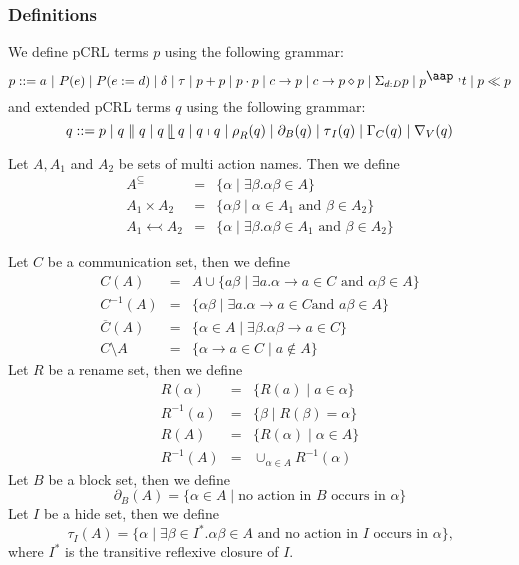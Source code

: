 \documentclass{article}
\begin{document}
\subsubsection{Definitions}

We define pCRL terms $p$ using the following grammar:%
\[
p::=a\ \mathbf{|}\ P(e)\mid P(e:=d)\mid \delta \mid \tau \mid p+p\mid p\cdot
p\mid c\rightarrow p\mid c\rightarrow p\diamond p\mid \Sigma _{d:D}p\mid p^{%
\mathbin{\mbox{\aap ,}}}t\mid p\ll p 
\]%
and extended pCRL terms $q$ using the following grammar:%
\[
q::=p\mid q\parallel q\mid q\mathbin{\mathrel{\llfloor}}q\mid q\shortmid
q\mid \rho _{R}(q)\mid \partial _{B}(q)\mid \tau _{I}(q)\mid \Gamma
_{C}(q)\mid \nabla _{V}(q) 
\]

Let $A,A_{1}$ and $A_{2}$ be sets of multi action names. Then we define%
\begin{eqnarray*}
A^{\subseteq } &=&\{\alpha \mid \exists \beta .\alpha \beta \in A\} \\
A_{1}\times A_{2} &=&\{\alpha \beta \mid \alpha \in A_{1}\text{ and }\beta
\in A_{2}\} \\
A_{1}\leftarrowtail A_{2} &=&\{\alpha \mid \exists \beta .\alpha \beta \in
A_{1}\text{ and }\beta \in A_{2}\}
\end{eqnarray*}

Let $C$ be a communication set, then we define%
\begin{eqnarray*}
C(A) &=&A\cup \{a\beta \mid \exists a.\alpha \rightarrow a\in C\text{ and }%
\alpha \beta \in A\} \\
C^{-1}(A) &=&\{\alpha \beta \mid \exists a.\alpha \rightarrow a\in C\text{
and }a\beta \in A\} \\
\overline{C}(A) &=&\{\alpha \in A\mid \exists \beta .\alpha \beta
\rightarrow a\in C\} \\
C\setminus A &=&\{\alpha \rightarrow a\in C\mid a\notin A\}
\end{eqnarray*}%
Let $R$ be a rename set, then we define%
\begin{eqnarray*}
R(\alpha ) &=&\{R(a)\mid a\in \alpha \} \\
R^{-1}(a) &=&\{\beta \mid R(\beta )=\alpha \} \\
R(A) &=&\{R(\alpha )\mid \alpha \in A\} \\
R^{-1}(A) &=&\cup _{\alpha \in A}R^{-1}(\alpha )
\end{eqnarray*}%
Let $B$ be a block set, then we define%
\[
\partial _{B}(A)=\{\alpha \in A\mid \text{no action in }B\text{ occurs in }%
\alpha \} 
\]%
Let $I$ be a hide set, then we define%
\[
\tau _{I}(A)=\{\alpha \mid \exists \beta \in I^{\ast }.\alpha \beta \in A%
\text{ and no action in }I\text{ occurs in }\alpha \}\text{,} 
\]%
where $I^{\ast }$ is the transitive reflexive closure of $I$.\newpage
\end{document}
